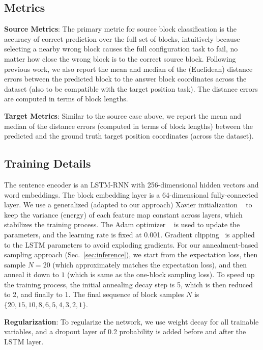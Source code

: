 \documentclass[letterpaper]{article} %
\begin{document}
\subsection{Metrics}

\noindent\textbf{Source Metrics}:
The primary metric for source block classification is the accuracy of correct prediction over the full set of blocks, intuitively because selecting a nearby wrong block causes the full configuration task to fail, no matter how close the wrong block is to the correct source block.
Following previous work, we also report the mean and median of the (Euclidean) distance errors between the predicted block to the answer block coordinates across the dataset (also to be compatible with the target position task). The distance errors are computed in terms of block lengths.


\noindent\textbf{Target Metrics}:
Similar to the source case above, we report the mean and median of the distance errors (computed in terms of block lengths) between the predicted and the ground truth target position coordinates (across the dataset).


\subsection{Training Details}
\label{sec:trainingdetails}
The sentence encoder is an LSTM-RNN with 256-dimensional hidden vectors and word embeddings. The block embedding layer is a 64-dimensional fully-connected layer. We use a generalized (adapted to our approach) Xavier initialization ~\cite{glorot2010understanding} to keep the variance (energy) of each feature map constant across layers, which stabilizes the training process. The Adam optimizer ~\cite{kingma2014adam} is used to update the parameters, and the learning rate is fixed at 0.001. Gradient clipping~\cite{pascanu2013difficulty} is applied to the LSTM parameters to avoid exploding gradients.
For our annealment-based sampling approach (Sec.~\ref{sec:inference}), we start from the expectation loss, then sample $N=20$ (which approximately matches the expectation loss), and then anneal it down to $1$ (which is same as the one-block sampling loss). To speed up the training process, the initial annealing decay step is 5, which is then reduced to 2, and finally to 1. The final sequence of block samples $N$ is $\{20, 15, 10, 8, 6, 5, 4, 3, 2, 1\}$.


\textbf{Regularization}: To regularize the network, we use weight decay for all trainable variables, and a dropout layer of 0.2 probability is added before and after the LSTM layer.
\end{document}
